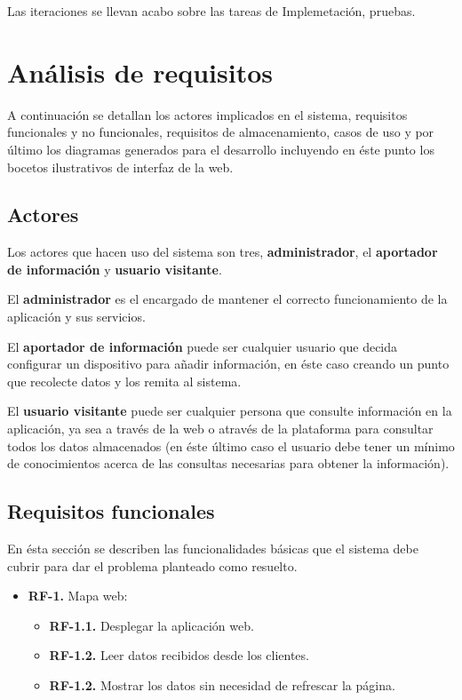 Las iteraciones se llevan acabo sobre las tareas de Implemetación, pruebas.



\section{Análisis de requisitos}

A continuación se detallan los actores implicados en el sistema, requisitos funcionales y no funcionales, requisitos de almacenamiento, casos de uso y por último los diagramas generados para el desarrollo incluyendo en éste punto los bocetos ilustrativos de interfaz de la web.

\subsection{Actores}

Los actores que hacen uso del sistema son tres, \textbf{administrador}, el \textbf{aportador de información} y \textbf{usuario visitante}.

\bigskip
El \textbf{administrador} es el encargado de mantener el correcto funcionamiento de la aplicación y sus servicios.

\bigskip
El \textbf{aportador de información} puede ser cualquier usuario que decida configurar un dispositivo para añadir información, en éste caso creando un punto que recolecte datos y los remita al sistema.

\bigskip
El \textbf{usuario visitante} puede ser cualquier persona que consulte información en la aplicación, ya sea a través de la web o através de la plataforma para consultar todos los datos almacenados (en éste último caso el usuario debe tener un mínimo de conocimientos acerca de las consultas necesarias para obtener la información).

\subsection{Requisitos funcionales}

En ésta sección se describen las funcionalidades básicas que el sistema debe cubrir para dar el problema planteado como resuelto.

\begin{itemize}
  \item \textbf{RF-1.} Mapa web:
    \begin{itemize}
      \item \textbf{RF-1.1.} Desplegar la aplicación web.
      \item \textbf{RF-1.2.} Leer datos recibidos desde los clientes.
      \item \textbf{RF-1.2.} Mostrar los datos sin necesidad de refrescar la página.
    \end{itemize}
\end{itemize}

